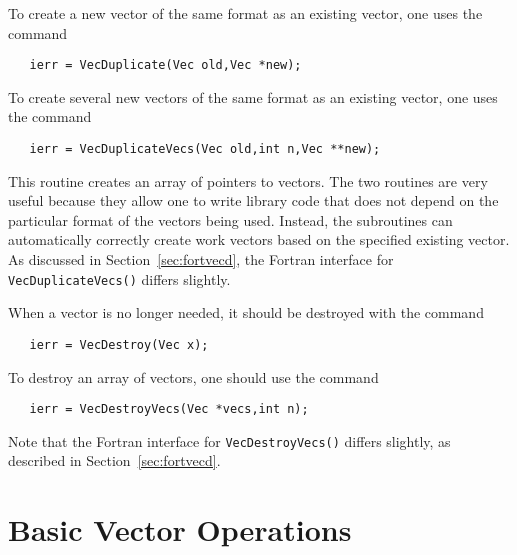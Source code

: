 To create a new vector of the same format as an existing vector, one uses
the command 
\begin{verbatim}
   ierr = VecDuplicate(Vec old,Vec *new);
\end{verbatim}
To create several new vectors of the same format as an existing vector,
one uses the command 
\begin{verbatim}
   ierr = VecDuplicateVecs(Vec old,int n,Vec **new);
\end{verbatim}
This routine creates an array of pointers to vectors. The two routines 
are very useful because they allow one to write library code that does 
not depend on the particular format of the vectors being used. Instead,
the subroutines can automatically correctly create work vectors
based on the specified existing vector.  As discussed in 
Section~\ref{sec:fortvecd}, the Fortran interface for {\tt VecDuplicateVecs()}
differs slightly.

When a vector is no longer needed, it should be destroyed with the 
command 
\begin{verbatim}
   ierr = VecDestroy(Vec x);
\end{verbatim}
To destroy an array of vectors, one should use the command 
\begin{verbatim}
   ierr = VecDestroyVecs(Vec *vecs,int n);
\end{verbatim}
Note that the Fortran interface for {\tt VecDestroyVecs()} differs slightly,
as described in Section~\ref{sec:fortvecd}.

\section{Basic Vector Operations}

